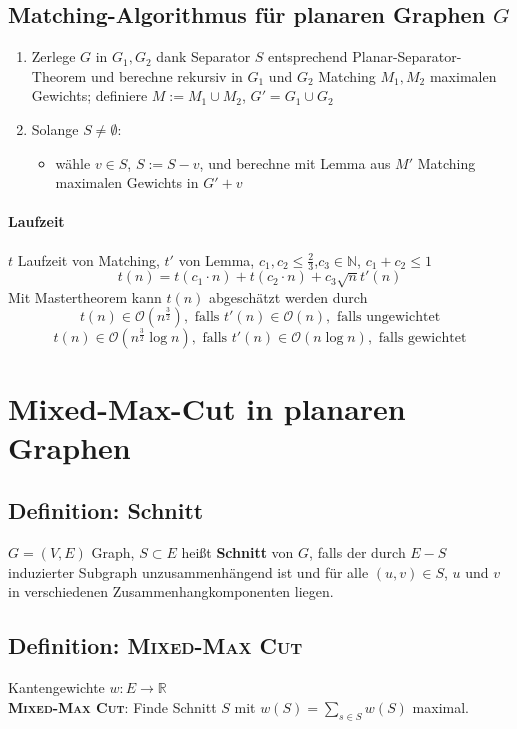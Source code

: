 \documentclass{article}
\newcommand{\df}[1]{\textbf{#1}\index{#1}}
\newcommand{\N}{\mathbb{N}}
\renewcommand{\O}[1]{\mathcal{O}\left(#1\right)}
\newcommand{\R}{\mathbb{R}}
\begin{document}
\subsection{Matching-Algorithmus für planaren Graphen $G$}
\begin{enumerate}
	\item Zerlege $G$ in $G_1, G_2$ dank Separator $S$ entsprechend Planar-Separator-Theorem und berechne rekursiv in $G_1$ und $G_2$ Matching $M_1, M_2$ maximalen Gewichts; definiere $M:= M_1\cup M_2$, $G' = G_1\cup G_2$
	\item Solange $S \neq \emptyset$:
	\begin{itemize}
		\item wähle $v\in S$, $S:= S-v$, und berechne mit Lemma aus $M'$ Matching maximalen Gewichts in $G'+v$
	\end{itemize}
\end{enumerate}

\paragraph{Laufzeit}
$t$ Laufzeit von Matching, $t'$ von Lemma, $c_1,c_2 \leq \frac{2}{3}$,$c_3\in \N$, $c_1+c_2 \leq 1$
\[t(n) = t(c_1\cdot n )+t(c_2\cdot n ) + c_3\sqrt{n}t'(n)\]
Mit Mastertheorem kann $t(n)$ abgeschätzt werden durch
\[t(n) \in \O{n^\frac{3}{2}}, \text{ falls }t'(n) \in \O{n}, \text{ falls ungewichtet}\]
\[t(n) \in \O{n^\frac{3}{2}\log n}, \text{ falls }t'(n) \in \O{n\log n}, \text{ falls gewichtet}\]

\newpage
\section{Mixed-Max-Cut in planaren Graphen}

\subsection{Definition: Schnitt}
$G = (V,E)$ Graph, $S \subset E$ heißt \df{Schnitt} von $G$, falls der durch $E-S$ induzierter Subgraph unzusammenhängend ist und für alle $(u,v) \in S$, $u$ und $v$ in verschiedenen Zusammenhangkomponenten liegen.

\subsection{Definition: \textsc{Mixed-Max Cut}}
Kantengewichte $w: E \rightarrow \R$\\
\df{\textsc{Mixed-Max Cut}}: Finde Schnitt $S$ mit $w(S) = \sum_{s\in S}w(S)$ maximal.
\end{document}
